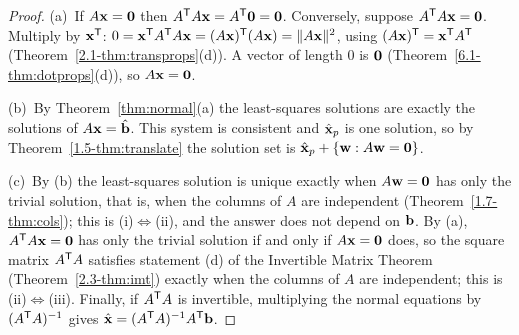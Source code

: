 \documentclass[11pt]{article}
\begin{document}
\begin{proof}
(a)~If $A\mathbf{x}=\mathbf{0}$ then $A^{\mathsf T} A\mathbf{x}=A^{\mathsf T}\mathbf{0}=\mathbf{0}$. Conversely, suppose $A^{\mathsf T} A\mathbf{x}=\mathbf{0}$. Multiply by $\mathbf{x}^{\mathsf T}$: $0=\mathbf{x}^{\mathsf T} A^{\mathsf T} A\mathbf{x}=(A\mathbf{x})^{\mathsf T}(A\mathbf{x})=\lVert A\mathbf{x}\rVert^2$, using $(A\mathbf{x})^{\mathsf T}=\mathbf{x}^{\mathsf T} A^{\mathsf T}$ (Theorem~\ref{2.1-thm:transprops}(d)). A vector of length $0$ is $\mathbf{0}$ (Theorem~\ref{6.1-thm:dotprops}(d)), so $A\mathbf{x}=\mathbf{0}$.

(b)~By Theorem~\ref{thm:normal}(a) the least-squares solutions are exactly the solutions of $A\mathbf{x}=\hat{\mathbf{b}}$. This system is consistent and $\hat{\mathbf{x}}_p$ is one solution, so by Theorem~\ref{1.5-thm:translate} the solution set is $\hat{\mathbf{x}}_p+\{\mathbf{w}:A\mathbf{w}=\mathbf{0}\}$.

(c)~By (b) the least-squares solution is unique exactly when $A\mathbf{w}=\mathbf{0}$ has only the trivial solution, that is, when the columns of $A$ are independent (Theorem~\ref{1.7-thm:cols}); this is (i)$\Leftrightarrow$(ii), and the answer does not depend on $\mathbf{b}$. By (a), $A^{\mathsf T} A\mathbf{x}=\mathbf{0}$ has only the trivial solution if and only if $A\mathbf{x}=\mathbf{0}$ does, so the square matrix $A^{\mathsf T} A$ satisfies statement (d) of the Invertible Matrix Theorem (Theorem~\ref{2.3-thm:imt}) exactly when the columns of $A$ are independent; this is (ii)$\Leftrightarrow$(iii). Finally, if $A^{\mathsf T} A$ is invertible, multiplying the normal equations by $(A^{\mathsf T} A)^{-1}$ gives $\hat{\mathbf{x}}=(A^{\mathsf T} A)^{-1}A^{\mathsf T}\mathbf{b}$.
\end{proof}
\end{document}
